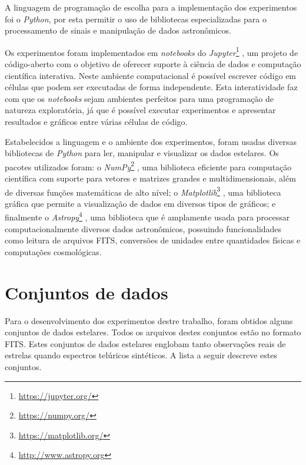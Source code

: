 A linguagem de programação de escolha para a implementação dos experimentos foi o \textit{Python}, por esta permitir o uso de bibliotecas especializadas para o processamento de sinais e manipulação de dados astronômicos.

Os experimentos foram implementados em \textit{notebooks} do \textit{Jupyter}\footnote{\url{https://jupyter.org/}} \citep{Kluyver:2016aa}, um projeto de código-aberto com o objetivo de oferecer suporte à ciência de dados e computação científica interativa. Neste ambiente computacional é possível escrever código em células que podem ser executadas de forma independente. Esta interatividade faz com que os \textit{notebooks} sejam ambientes perfeitos para uma programação de natureza exploratória, já que é possível executar experimentos e apresentar resultados e gráficos entre várias células de código.

Estabelecidos a linguagem e o ambiente dos experimentos, foram usadas diversas bibliotecas de \textit{Python} para ler, manipular e visualizar os dados estelares. Os pacotes utilizados foram: o \textit{NumPy}\footnote{\url{https://numpy.org/}} \citep{oliphant2006guide}, uma biblioteca eficiente para computação científica com suporte para vetores e matrizes grandes e multidimensionais, além de diversas funções matemáticas de alto nível; o \textit{Matplotlib}\footnote{\url{https://matplotlib.org/}} \citep{Hunter:2007}, uma biblioteca gráfica que permite a visualização de dados em diversos tipos de gráficos; e finalmente o \textit{Astropy}\footnote{\url{http://www.astropy.org}} \citep{astropy:2018}, uma biblioteca que é amplamente usada para processar computacionalmente diversos dados astronômicos, possuindo funcionalidades como leitura de arquivos FITS, conversões de unidades entre quantidades físicas e computações cosmológicas.

\section{Conjuntos de dados}

Para o desenvolvimento dos experimentos destre trabalho, foram obtidos alguns conjuntos de dados estelares. Todos os arquivos destes conjuntos estão no formato FITS. Estes conjuntos de dados estelares englobam tanto observações reais de estrelas quando espectros telúricos sintéticos. A lista a seguir descreve estes conjuntos.

